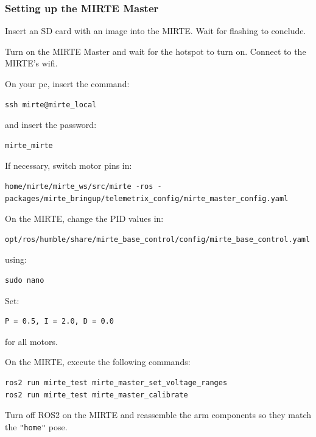 \subsubsection{Setting up the MIRTE Master}

Insert an SD card with an image into the MIRTE.
Wait for flashing to conclude.

Turn on the MIRTE Master and wait for the hotspot to turn on.
Connect to the MIRTE's wifi.

On your pc, insert the command:

\begin{verbatim}
ssh mirte@mirte_local
\end{verbatim}

and insert the password:

\begin{verbatim}
mirte_mirte
\end{verbatim}

If necessary, switch motor pins in:

\begin{verbatim}
home/mirte/mirte_ws/src/mirte -ros -packages/mirte_bringup/telemetrix_config/mirte_master_config.yaml
\end{verbatim}

On the MIRTE, change the PID values in:

\begin{verbatim}
opt/ros/humble/share/mirte_base_control/config/mirte_base_control.yaml
\end{verbatim}

using:

\begin{verbatim}
sudo nano
\end{verbatim}

Set:

\begin{verbatim}
P = 0.5, I = 2.0, D = 0.0
\end{verbatim}

for all motors.

On the MIRTE, execute the following commands:

\begin{verbatim}
ros2 run mirte_test mirte_master_set_voltage_ranges
ros2 run mirte_test mirte_master_calibrate
\end{verbatim}

Turn off ROS2 on the MIRTE and reassemble the arm components so they match the \texttt{"home"} pose.